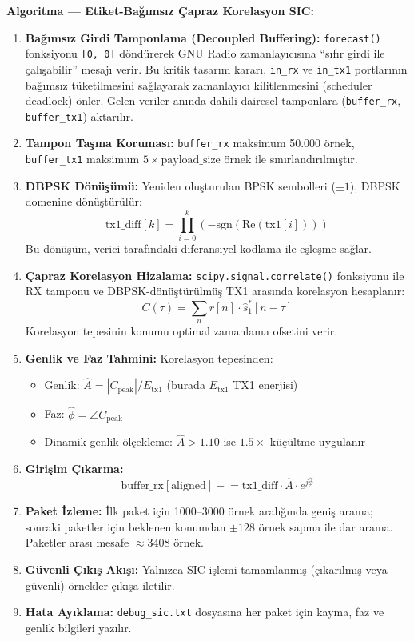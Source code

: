 \documentclass[
]{IEEEtran}
\providecommand{\tightlist}{%
  \setlength{\itemsep}{0pt}\setlength{\parskip}{0pt}}
\begin{document}
\textbf{Algoritma --- Etiket-Bağımsız Çapraz Korelasyon SIC:}

\begin{enumerate}
\def\labelenumi{\arabic{enumi}.}
\item
  \textbf{Bağımsız Girdi Tamponlama (Decoupled Buffering):}
  \texttt{forecast()} fonksiyonu \texttt{{[}0,\ 0{]}} döndürerek GNU
  Radio zamanlayıcısına ``sıfır girdi ile çalışabilir'' mesajı verir. Bu
  kritik tasarım kararı, \texttt{in\_rx} ve \texttt{in\_tx1} portlarının
  bağımsız tüketilmesini sağlayarak zamanlayıcı kilitlenmesini
  (scheduler deadlock) önler. Gelen veriler anında dahili dairesel
  tamponlara (\texttt{buffer\_rx}, \texttt{buffer\_tx1}) aktarılır.
\item
  \textbf{Tampon Taşma Koruması:} \texttt{buffer\_rx} maksimum 50.000
  örnek, \texttt{buffer\_tx1} maksimum \(5 \times \text{payload\_size}\)
  örnek ile sınırlandırılmıştır.
\item
  \textbf{DBPSK Dönüşümü:} Yeniden oluşturulan BPSK sembolleri
  (\(\pm 1\)), DBPSK domenine dönüştürülür:
  \[\text{tx1\_diff}[k] = \prod_{i=0}^{k} (-\text{sgn}(\text{Re}(\text{tx1}[i])))\]
  Bu dönüşüm, verici tarafındaki diferansiyel kodlama ile eşleşme
  sağlar.
\item
  \textbf{Çapraz Korelasyon Hizalama:} \texttt{scipy.signal.correlate()}
  fonksiyonu ile RX tamponu ve DBPSK-dönüştürülmüş TX1 arasında
  korelasyon hesaplanır:
  \[C(\tau) = \sum_{n} r[n] \cdot \hat{s}_1^*[n - \tau]\] Korelasyon
  tepesinin konumu optimal zamanlama ofsetini verir.
\item
  \textbf{Genlik ve Faz Tahmini:} Korelasyon tepesinden:

  \begin{itemize}
  \tightlist
  \item
    Genlik: \(\hat{A} = |C_{\text{peak}}| / E_{\text{tx1}}\) (burada
    \(E_{\text{tx1}}\) TX1 enerjisi)
  \item
    Faz: \(\hat{\phi} = \angle C_{\text{peak}}\)
  \item
    Dinamik genlik ölçekleme: \(\hat{A} > 1.10\) ise \(1.5\times\)
    küçültme uygulanır
  \end{itemize}
\item
  \textbf{Girişim Çıkarma:}
  \[\text{buffer\_rx}[\text{aligned}] \mathrel{-}= \text{tx1\_diff} \cdot \hat{A} \cdot e^{j\hat{\phi}}\]
\item
  \textbf{Paket İzleme:} İlk paket için 1000--3000 örnek aralığında
  geniş arama; sonraki paketler için beklenen konumdan \(\pm 128\) örnek
  sapma ile dar arama. Paketler arası mesafe \(\approx 3408\) örnek.
\item
  \textbf{Güvenli Çıkış Akışı:} Yalnızca SIC işlemi tamamlanmış
  (çıkarılmış veya güvenli) örnekler çıkışa iletilir.
\item
  \textbf{Hata Ayıklama:} \texttt{debug\_sic.txt} dosyasına her paket
  için kayma, faz ve genlik bilgileri yazılır.
\end{enumerate}
\end{document}
